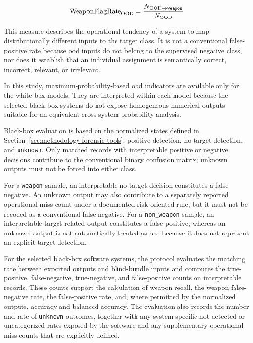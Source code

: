 \begin{equation}
\mathrm{WeaponFlagRate}_{\mathrm{OOD}}
=
\frac{
N_{\mathrm{OOD}\rightarrow\text{\texttt{weapon}}}
}{
N_{\mathrm{OOD}}
}
\end{equation}

This measure describes the operational tendency of a system to map
distributionally different inputs to the target class. It is not a conventional
false-positive rate because \gls{ood} inputs do not belong to the supervised
negative class, nor does it establish that an individual assignment is
semantically correct, incorrect, relevant, or irrelevant.

In this study, maximum-probability-based \gls{ood} indicators are available
only for the white-box models. They are interpreted within each model because the selected
black-box systems do not expose homogeneous numerical outputs suitable for an
equivalent cross-system probability analysis.

Black-box evaluation is based on the normalized states defined in
Section~\ref{sec:methodology-forensic-tools}: positive detection, no target
detection, and \texttt{unknown}. Only matched records with interpretable
positive or negative decisions contribute to the conventional binary confusion
matrix; unknown outputs must not be forced into either class.

For a \texttt{weapon} sample, an interpretable no-target decision constitutes a
false negative. An unknown output may also contribute to a separately reported
operational miss count under a documented risk-oriented rule, but it must not
be recoded as a conventional false negative. For a
\texttt{non\_weapon} sample, an interpretable target-related output constitutes
a false positive, whereas an unknown output is not automatically treated as
one because it does not represent an explicit target detection.


For the selected black-box software systems, the protocol evaluates the matching
rate between exported outputs and blind-bundle inputs and computes the
true-positive, false-negative, true-negative, and false-positive counts on
interpretable records. These counts support the calculation of weapon recall,
the weapon false-negative rate, the false-positive rate, and, where permitted by
the normalized outputs, accuracy and balanced accuracy. The evaluation also
records the number and rate of \texttt{unknown} outcomes, together with any
system-specific not-detected or uncategorized rates exposed by the software and
any supplementary operational miss counts that are explicitly defined.



